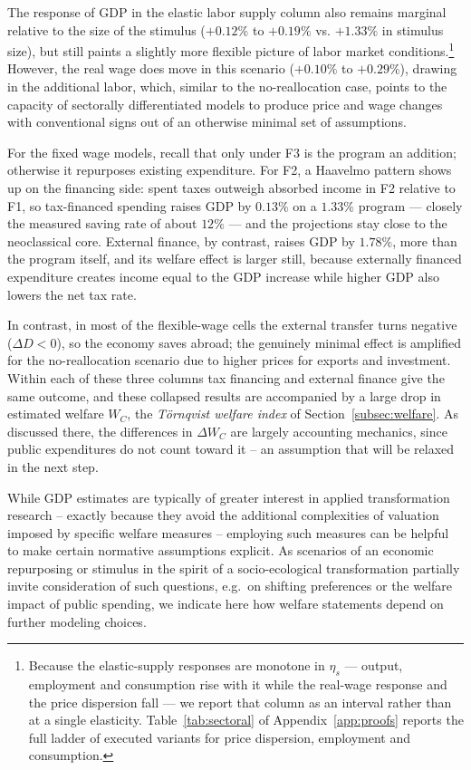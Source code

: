The response of GDP in the elastic labor supply column also remains marginal relative to the size of the stimulus ($+0.12\%$ to $+0.19\%$ vs. $+1.33\%$ in stimulus size), but still paints a slightly more flexible picture of labor market conditions.\footnote{Because the elastic-supply responses are monotone in $\eta_s$ --- output, employment and consumption rise with it while the real-wage response and the price dispersion fall --- we report that column as an interval rather than at a single elasticity. Table~\ref{tab:sectoral} of Appendix~\ref{app:proofs} reports the full ladder of executed variants for price dispersion, employment and consumption.} However, the real wage does move in this scenario ($+0.10\%$ to $+0.29\%$), drawing in the additional labor, which, similar to the no-reallocation case, points to the capacity of sectorally differentiated models to produce price and wage changes with conventional signs out of an otherwise minimal set of assumptions. 

For the fixed wage models, recall that only under F3 is the program an addition; otherwise it repurposes existing expenditure. For F2, a Haavelmo pattern shows up on the financing side: spent taxes outweigh absorbed income in F2 relative to F1, so tax-financed spending raises GDP by $0.13\%$ on a $1.33\%$ program --- closely the measured saving rate of about $12\%$ --- and the projections stay close to the neoclassical core. External finance, by contrast, raises GDP by $1.78\%$, more than the program itself, and its welfare effect is larger still, because externally financed expenditure creates income equal to the GDP increase while higher GDP also lowers the net tax rate.

In contrast, in most of the flexible-wage cells the external transfer turns negative ($\Delta D<0$), so the economy saves abroad; the genuinely minimal effect is amplified for the no-reallocation scenario due to higher prices for exports and investment. Within each of these three columns tax financing and external finance give the same outcome, and these collapsed results are accompanied by a large drop in estimated welfare $W_C$, the \emph{T\"ornqvist welfare index} of Section~\ref{subsec:welfare}. As discussed there, the differences in $\Delta W_C$ are largely accounting mechanics, since public expenditures do not count toward it -- an assumption that will be relaxed in the next step.

While GDP estimates are typically of greater interest in applied transformation research -- exactly because they avoid the additional complexities of valuation imposed by specific welfare measures -- employing such measures can be helpful to make certain normative assumptions explicit. As scenarios of an economic repurposing or stimulus in the spirit of a socio-ecological transformation partially invite consideration of such questions, e.g.\ on shifting preferences or the welfare impact of public spending, we indicate here how welfare statements depend on further modeling choices.

